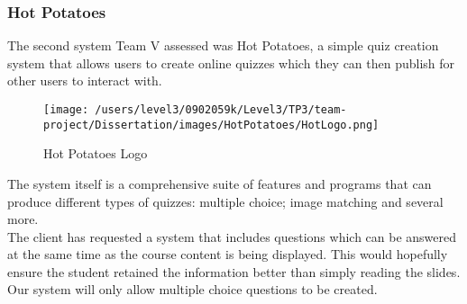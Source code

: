 \documentclass{l3proj}
\begin{document}
\subsubsection{Hot Potatoes}

The second system Team V assessed was Hot Potatoes, a simple quiz
creation system that allows users to create online quizzes which they
can then publish for other users to interact with.\\ 

\begin{figure}[!htb]
\caption{Hot Potatoes Logo}
 \centering
\texttt{[image: /users/level3/0902059k/Level3/TP3/team-project/Dissertation/images/HotPotatoes/HotLogo.png]}
\end{figure}

The system itself is a comprehensive suite of features and programs
that can produce different types of quizzes: multiple choice; image
matching and several more.\\

The client has requested a system that includes questions which can be
answered at the same time as the course content is being
displayed. This would hopefully ensure the student retained the
information better than simply reading the slides. Our system will
only allow multiple choice questions to be created.
\end{document}
